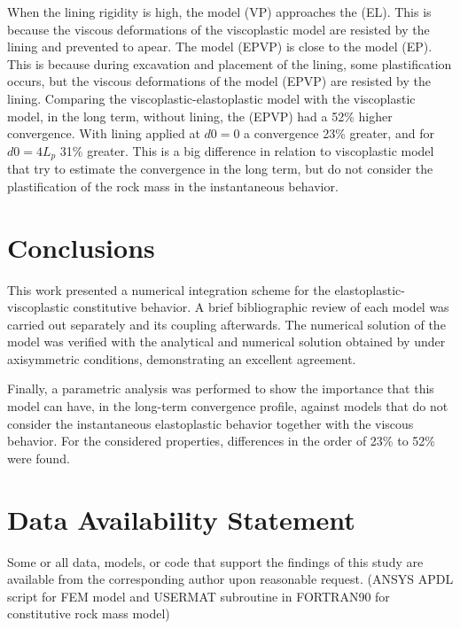 \documentclass[Journal,letterpaper]{ascelike-new}
\begin{document}
When the lining rigidity is high, the model (VP) approaches the (EL). This is because the viscous deformations of the viscoplastic model are resisted by the lining and prevented to apear. The model (EPVP) is close to the model (EP). This is because during excavation and placement of the lining, some plastification occurs, but the viscous deformations of the model (EPVP) are resisted by the lining. Comparing the viscoplastic-elastoplastic model with the viscoplastic model, in the long term, without lining, the (EPVP) had a 52\% higher convergence. With lining applied at $d0=0$ a convergence 23\% greater, and for $d0=4L_p$ 31\% greater. This is a big difference in relation to viscoplastic model that try to estimate the convergence in the long term, but do not consider the plastification of the rock mass in the instantaneous behavior.

\section{Conclusions}

This work presented a numerical integration scheme for the elastoplastic-viscoplastic constitutive behavior. A brief bibliographic review of each model was carried out separately and its coupling afterwards. The numerical solution of the model was verified with the analytical and numerical solution obtained by  under axisymmetric conditions, demonstrating an excellent agreement.

Finally, a parametric analysis was performed to show the importance that this model can have, in the long-term convergence profile, against models that do not consider the instantaneous elastoplastic behavior together with the viscous behavior. For the considered properties, differences in the order of 23\% to 52\% were found.

\section{Data Availability Statement}

Some or all data, models, or code that support the findings of this study are available from the corresponding author upon reasonable request. (ANSYS APDL script for FEM model and USERMAT subroutine in FORTRAN90 for constitutive rock mass model)

\pagebreak
%
%
%
%
%
%
%

%
\end{document}
